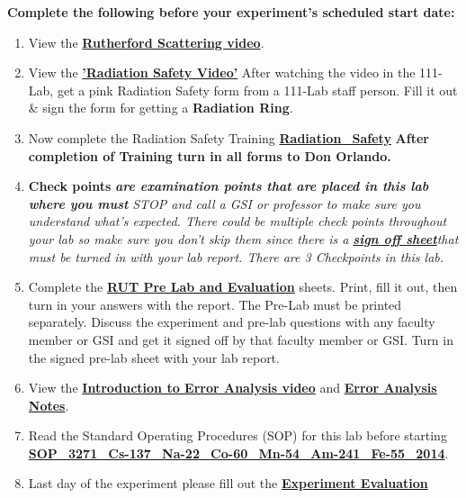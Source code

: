 \documentclass{../lab}
\begin{document}
\textbf{Complete the following before your experiment's scheduled start date:}

\begin{enumerate}
    \item View the \href{http://youtu.be/xHzzXiMEmaU}{\textbf{Rutherford Scattering video}}.

    \item View the \href{http://youtu.be/KHxtzF5pZZM}{\textbf{'\textbf{Radiation Safety Video'}}} After watching the video in the 111-Lab, get a pink Radiation Safety form from a 111-Lab staff person. Fill it out \& sign the form for getting a \textbf{Radiation Ring}.

    \item Now complete the Radiation Safety Training \href{http://experimentationlab.berkeley.edu/RadiationSafety}{\textbf{Radiation\_Safety}} \textbf{After completion of Training turn in all forms to Don Orlando.}

    \item \textbf{Check points} \emph{\textbf{are examination points that are placed in this lab where you must }}\emph{STOP and call a GSI or professor to make sure you understand what's expected. There could  be multiple check points throughout your lab so make sure you don't skip them since there is a \href{http://experimentationlab.berkeley.edu/rutcheckpoints}{\textbf{sign off sheet}}that must be turned in with your lab report. There are 3 Checkpoints in this lab.}

    \item Complete the \href{http://experimentationlab.berkeley.edu/RUTPreLab}{\textbf{RUT Pre Lab and Evaluation}} sheets. Print,  fill it out, then turn in your answers with the report. The Pre-Lab must be printed separately. Discuss the experiment and pre-lab questions with any faculty member or GSI and get it signed off by that faculty member or GSI. Turn in the signed pre-lab sheet with your lab report.

    \item View the \href{\ErrorAnalysisVideo}{\textbf{Introduction to Error Analysis video}} and \href{http://experimentationlab.berkeley.edu/EAX}{\textbf{Error Analysis Notes}}.

    \item Read the Standard Operating Procedures (SOP) for this lab before starting \href{http://experimentationlab.berkeley.edu/sites/default/files/images/SOP\_3271\_Cs-137\_Na-22\_Co-60\_Mn-54\_Am-241\_Fe-55\_2014.pdf}{\textbf{SOP\_3271\_Cs-137\_Na-22\_Co-60\_Mn-54\_Am-241\_Fe-55\_2014}}.

    \item Last day of the experiment please fill out the \href{\ExperimentEvaluation}{\textbf{Experiment Evaluation}}

\end{enumerate}
\end{document}
